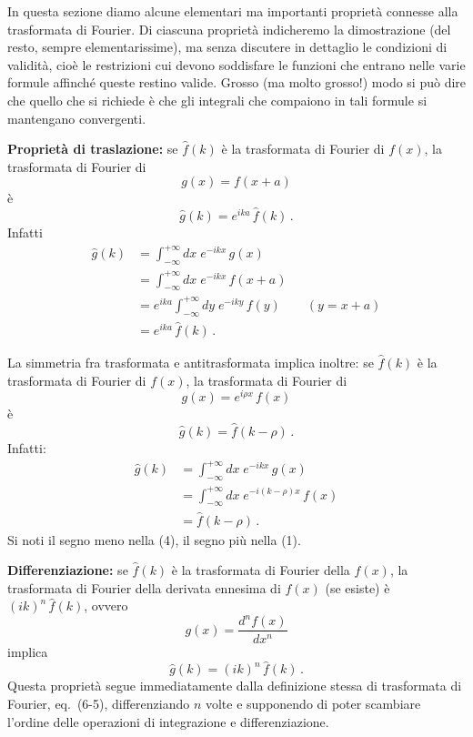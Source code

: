 \documentclass[11pt, a4paper]{book}
\numberwithin{equation}{section}
\begin{document}
In questa sezione diamo alcune elementari ma importanti proprietà connesse alla trasformata di Fourier. Di ciascuna proprietà indicheremo la dimostrazione (del resto, sempre elementarissime), ma senza discutere in dettaglio le condizioni di validità, cioè le restrizioni cui devono soddisfare le funzioni che entrano nelle varie formule affinché queste restino valide. Grosso (ma molto grosso!) modo si può dire che quello che si richiede è che gli integrali che compaiono in tali formule si mantengano convergenti.

\textbf{Proprietà di traslazione:} se $\hat{f}(k)$ è la trasformata di Fourier di $f(x)$, la trasformata di Fourier di
\begin{equation}
  g(x) = f(x+a) \tag{1}
\end{equation}
è
\begin{equation}
  \hat{g}(k) = e^{ika}\,\hat{f}(k)\,. \tag{2}
\end{equation}
Infatti
\begin{align*}
  \hat{g}(k) &= \int_{-\infty}^{+\infty} dx\;e^{-ikx}\,g(x)\\
  &= \int_{-\infty}^{+\infty} dx\;e^{-ikx}\,f(x+a)\\
  &= e^{ika}\int_{-\infty}^{+\infty} dy\;e^{-iky}\,f(y)\qquad(y=x+a)\\
  &= e^{ika}\,\hat{f}(k)\,.
\end{align*}

La simmetria fra trasformata e antitrasformata implica inoltre: se $\hat{f}(k)$ è la trasformata di Fourier di $f(x)$, la trasformata di Fourier di
\begin{equation}
  g(x) = e^{i\rho x}\,f(x) \tag{3}
\end{equation}
è
\begin{equation}
  \hat{g}(k) = \hat{f}(k-\rho)\,. \tag{4}
\end{equation}
Infatti:
\begin{align*}
  \hat{g}(k) &= \int_{-\infty}^{+\infty} dx\;e^{-ikx}\,g(x)\\
  &= \int_{-\infty}^{+\infty} dx\;e^{-i(k-\rho)x}\,f(x)\\
  &= \hat{f}(k-\rho)\,.
\end{align*}
Si noti il segno meno nella (4), il segno più nella (1).

\textbf{Differenziazione:} se $\hat{f}(k)$ è la trasformata di Fourier della $f(x)$, la trasformata di Fourier della derivata ennesima di $f(x)$ (se esiste) è $(ik)^n\,\hat{f}(k)$, ovvero
\begin{equation}
  g(x) = \frac{d^n f(x)}{dx^n} \tag{5}
\end{equation}
implica
\begin{equation}
  \hat{g}(k) = (ik)^n\,\hat{f}(k)\,. \tag{6}
\end{equation}
Questa proprietà segue immediatamente dalla definizione stessa di trasformata di Fourier, eq.\ (6-5), differenziando $n$ volte e supponendo di poter scambiare l'ordine delle operazioni di integrazione e differenziazione.
\end{document}
